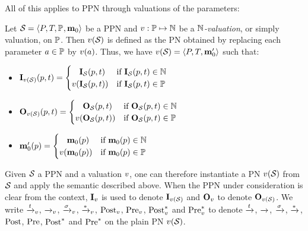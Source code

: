 All of this applies to \ac{PPN} through valuations of the parameters:
\begin{defi}
  Let $\defPPN$ be a \ac{PPN} and $\val : \parameters \mapsto \naturals$ be a \emph{$\mathbb{N}$-valuation}, or simply valuation, on $\mathbb{P}$.
  Then $\val[\namePPN]$ is defined as the \ac{PN} obtained by replacing each parameter $\param \in \parameters$ by $\val[\param]$.
  Thus, we have $\val[\namePPN] = \tuple{\places, \transitions, \mari'}$ such that:
  \begin{itemize}
    \item $\inm[\val(\namePPN)][p, t] =
      \begin{cases}
        \phantom{\val(}\inm[\namePPN][p, t]  & \text{if } \inm[\namePPN][p, t] \in \naturals \\
                 \val( \inm[\namePPN][p, t]) & \text{if } \inm[\namePPN][p, t] \in \parameters
      \end{cases}$
    \item $\outm[\val(\namePPN)][p, t] =
      \begin{cases}
        \phantom{\val(}\outm[\namePPN][p, t]  & \text{if } \outm[\namePPN][p, t] \in \naturals \\
                 \val( \outm[\namePPN][p, t]) & \text{if } \outm[\namePPN][p, t] \in \parameters
      \end{cases}$
    \item $\mari'(p) =
      \begin{cases}
        \phantom{\val(}\mari(p)  & \text{if } \mari(p) \in \naturals \\
                 \val( \mari(p)) & \text{if } \mari(p) \in \parameters
      \end{cases}$
  \end{itemize}
\end{defi}

Given $\mathcal{S}_{{}}$ a \ac{PPN} and a valuation $\val$, one can therefore instantiate a \ac{PN} $\val[\namePPN]$ from $\mathcal{S}_{{}}$ and apply the semantic described above.
When the \ac{PPN} under consideration is clear from the context, $\inm[\val]$ is used to denote $\inm[\val(\namePPN)]$ and $\outm[\val]$ to denote $\outm[\val(\namePPN)]$.
We write $\fire[\val]{t}$,
         $\fire[\val]{}$,
         $\fire[\val]{\sigma}$,
         $\fire[\val]{*}$,
         $\operatorname{Post}_v$,
         $\operatorname{Pre}_v$,
         $\operatorname{Post}^*_v$
     and $\operatorname{Pre}^*_v$
to denote $\xrightarrow{t}_{}$,
          $\xrightarrow{}_{}$,
          $\xrightarrow{\sigma}_{}$,
          $\xrightarrow{*}_{}$,
          $\operatorname{Post}$,
          $\operatorname{Pre}$,
          $\operatorname{Post}^*$
      and $\operatorname{Pre}^*$
on the plain \ac{PN} $\val(\namePPN)$.

